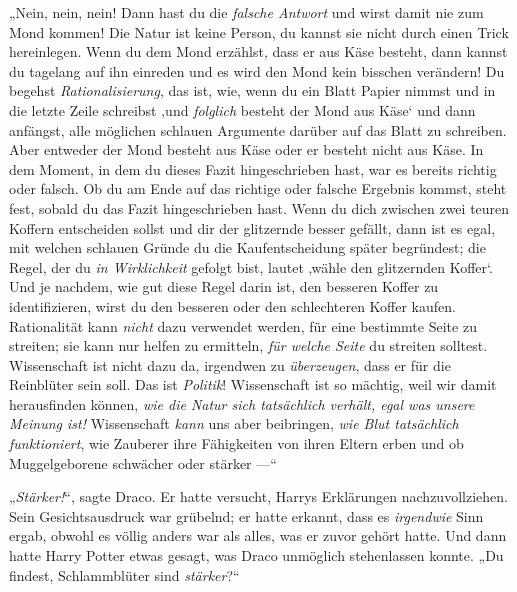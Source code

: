 „Nein, nein, nein! Dann hast du die \emph{falsche Antwort} und wirst damit nie zum Mond kommen! Die Natur ist keine Person, du kannst sie nicht durch einen Trick hereinlegen. Wenn du dem Mond erzählst, dass er aus Käse besteht, dann kannst du tagelang auf ihn einreden und es wird den Mond kein bisschen verändern! Du begehst \emph{Rationalisierung}, das ist, wie, wenn du ein Blatt Papier nimmst und in die letzte Zeile schreibst ‚und \emph{folglich} besteht der Mond aus Käse‘ und dann anfängst, alle möglichen schlauen Argumente darüber auf das Blatt zu schreiben. Aber entweder der Mond besteht aus Käse oder er besteht nicht aus Käse. In dem Moment, in dem du dieses Fazit hingeschrieben hast, war es bereits richtig oder falsch. Ob du am Ende auf das richtige oder falsche Ergebnis kommst, steht fest, sobald du das Fazit hingeschrieben hast. Wenn du dich zwischen zwei teuren Koffern entscheiden sollst und dir der glitzernde besser gefällt, dann ist es egal, mit welchen schlauen Gründe du die Kaufentscheidung später begründest; die Regel, der du \emph{in Wirklichkeit} gefolgt bist, lautet ‚wähle den glitzernden Koffer‘. Und je nachdem, wie gut diese Regel darin ist, den besseren Koffer zu identifizieren, wirst du den besseren oder den schlechteren Koffer kaufen. Rationalität kann \emph{nicht} dazu verwendet werden, für eine bestimmte Seite zu streiten; sie kann nur helfen zu ermitteln, \emph{für welche Seite} du streiten solltest. Wissenschaft ist nicht dazu da, irgendwen zu \emph{überzeugen}, dass er für die Reinblüter sein soll. Das ist \emph{Politik}! Wissenschaft ist so mächtig, weil wir damit herausfinden können, \emph{wie die Natur sich tatsächlich verhält, egal was unsere Meinung ist!} Wissenschaft \emph{kann} uns aber beibringen, \emph{wie Blut tatsächlich funktioniert}, wie Zauberer ihre Fähigkeiten von ihren Eltern erben und ob Muggelgeborene schwächer oder stärker —“

„\emph{Stärker!}“, sagte Draco. Er hatte versucht, Harrys Erklärungen nachzuvollziehen. Sein Gesichtsausdruck war grübelnd; er hatte erkannt, dass es \emph{irgendwie} Sinn ergab, obwohl es völlig anders war als alles, was er zuvor gehört hatte. Und dann hatte Harry Potter etwas gesagt, was Draco unmöglich stehenlassen konnte.
„Du findest, Schlammblüter sind \emph{stärker}?“

